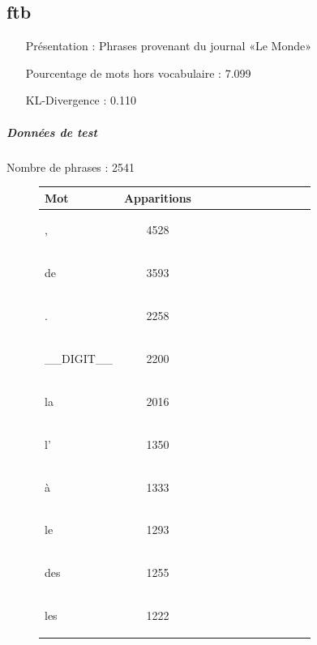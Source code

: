 \clearpage \subsection{ftb } 
 \begin{itemize} 
 \item[Présentation :] Phrases provenant du journal «Le Monde»

 \item[Pourcentage de mots hors vocabulaire : ]7.099
 \item[KL-Divergence :]0.110
 \end{itemize}  \subparagraph{Données de test \\ }  
 Nombre de phrases : 2541\\ 
\begin{figure}[H] \begin{minipage}{0.48\textwidth} \centering \begin{tabular}{|l || *{11 }{|c} |} \hline
Mot & Apparitions  \\ \hline
\begin{verb} , \end{verb} &4528\\ \hline
\begin{verb} de \end{verb} &3593\\ \hline
\begin{verb} . \end{verb} &2258\\ \hline
\begin{verb} __DIGIT__ \end{verb} &2200\\ \hline
\begin{verb} la \end{verb} &2016\\ \hline
\begin{verb} l' \end{verb} &1350\\ \hline
\begin{verb} à \end{verb} &1333\\ \hline
\begin{verb} le \end{verb} &1293\\ \hline
\begin{verb} des \end{verb} &1255\\ \hline
\begin{verb} les \end{verb} &1222\\ \hline


\end{tabular}
\end{minipage}
\end{figure}
